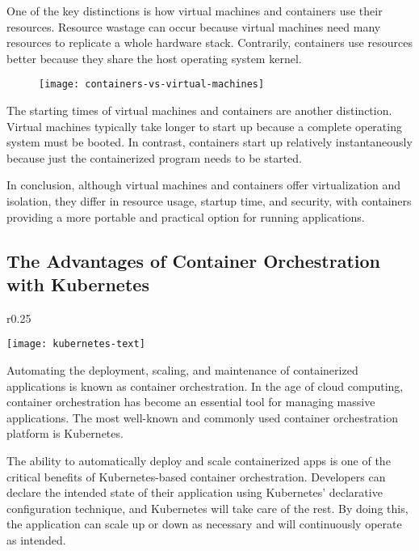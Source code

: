 One of the key distinctions is how virtual machines and containers use their resources. Resource wastage can occur because virtual machines need many resources to replicate a whole hardware stack. Contrarily, containers use resources better because they share the host operating system kernel.

\begin{figure}[H]
	\centering
	\texttt{[image: containers-vs-virtual-machines]}
	\label{fig:container-vs-vm}
\end{figure}

The starting times of virtual machines and containers are another distinction. Virtual machines typically take longer to start up because a complete operating system must be booted. In contrast, containers start up relatively instantaneously because just the containerized program needs to be started.

In conclusion, although virtual machines and containers offer virtualization and isolation, they differ in resource usage, startup time, and security, with containers providing a more portable and practical option for running applications.

\subsection{The Advantages of Container Orchestration with Kubernetes}

\begin{wrapfigure}{r}{0.25\textwidth}
    \begin{center}
        \texttt{[image: kubernetes-text]}
	  \label{fig:kubernetes-logo}
    \end{center}
\end{wrapfigure}
Automating the deployment, scaling, and maintenance of containerized applications is known as container orchestration. In the age of cloud computing, container orchestration has become an essential tool for managing massive applications. The most well-known and commonly used container orchestration platform is Kubernetes.

The ability to automatically deploy and scale containerized apps is one of the critical benefits of Kubernetes-based container orchestration. Developers can declare the intended state of their application using Kubernetes' declarative configuration technique, and Kubernetes will take care of the rest. By doing this, the application can scale up or down as necessary and will continuously operate as intended.

